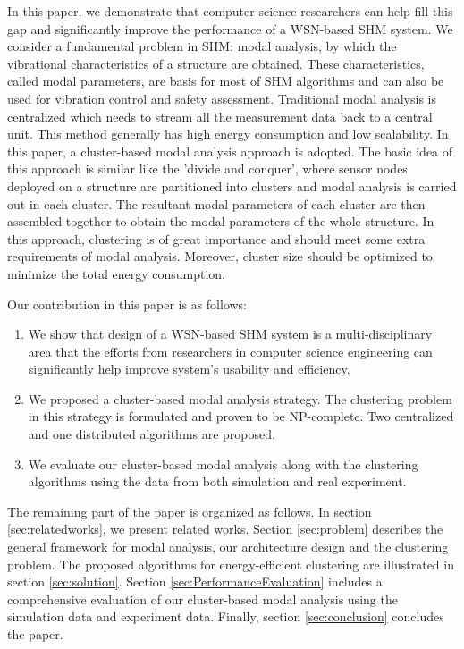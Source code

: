 In this paper, we demonstrate that computer science researchers can help fill this gap and significantly improve the performance of a WSN-based SHM system. We consider a fundamental problem in SHM: modal analysis, by which the vibrational characteristics of a structure are obtained.  These characteristics, called modal parameters, are basis for most of SHM algorithms and can also be used for vibration control and safety assessment. Traditional modal analysis is centralized which needs to stream all the measurement data back to a central unit. This method generally has high energy consumption and low scalability. In this paper, a cluster-based modal analysis approach is adopted. The basic idea of this approach is similar like the 'divide and conquer', where sensor nodes deployed on a structure are partitioned into clusters and modal analysis is carried out in each cluster. The resultant modal parameters of each cluster are then assembled together to obtain the modal parameters of the whole structure. In this approach, clustering is of great importance and should meet some extra requirements of modal analysis. Moreover, cluster size should be optimized to minimize the total energy consumption.

Our contribution in this paper is as follows:
\begin{enumerate}
\item	We show that design of a WSN-based SHM system is a multi-disciplinary area that the efforts from researchers in computer science engineering can significantly help improve system's usability and efficiency. 
\item We proposed a cluster-based modal analysis strategy. The clustering problem in this strategy is formulated and proven to be NP-complete.  Two centralized and one distributed algorithms are proposed.
\item	We evaluate our cluster-based modal analysis along with the clustering algorithms using the data from both simulation and real experiment.
\end{enumerate}

The remaining part of the paper is organized as follows. In section \ref{sec:relatedworks}, we present related works. Section \ref{sec:problem} describes the general framework for modal analysis, our architecture design and the clustering problem. The proposed algorithms for energy-efficient clustering are illustrated in section \ref{sec:solution}. Section \ref{sec:PerformanceEvaluation} includes a comprehensive evaluation of our cluster-based modal analysis using the simulation data and experiment data. Finally, section \ref{sec:conclusion} concludes the paper.